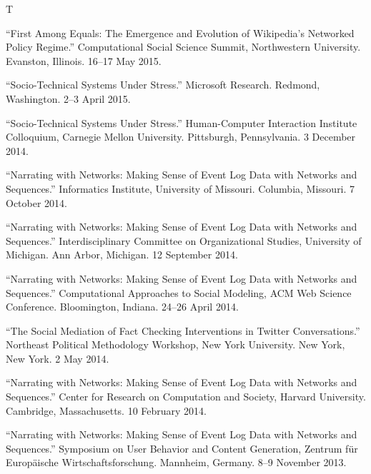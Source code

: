 \documentclass{cv}
\begin{document}
\begin{entries}{T}
		\item ``First Among Equals: The Emergence and Evolution of Wikipedia's Networked Policy Regime.'' Computational Social Science Summit, Northwestern University. Evanston, Illinois. 16--17 May 2015.
		\item ``Socio-Technical Systems Under Stress.'' Microsoft Research. Redmond, Washington. 2--3 April 2015.
		\item ``Socio-Technical Systems Under Stress.'' Human-Computer Interaction Institute Colloquium, Carnegie Mellon University. Pittsburgh, Pennsylvania. 3 December 2014.
		\item ``Narrating with Networks: Making Sense of Event Log Data with Networks and Sequences.'' Informatics Institute, University of Missouri. Columbia, Missouri. 7 October 2014.
		\item ``Narrating with Networks: Making Sense of Event Log Data with Networks and Sequences.'' Interdisciplinary Committee on Organizational Studies, University of Michigan. Ann Arbor, Michigan. 12 September 2014.
		\item ``Narrating with Networks: Making Sense of Event Log Data with Networks and Sequences.'' Computational Approaches to Social Modeling, ACM Web Science Conference. Bloomington, Indiana. 24--26 April 2014.
		\item ``The Social Mediation of Fact Checking Interventions in Twitter Conversations.'' Northeast Political Methodology Workshop, New York University. New York, New York. 2 May 2014.
		\item ``Narrating with Networks: Making Sense of Event Log Data with Networks and Sequences.'' Center for Research on Computation and Society, Harvard University. Cambridge, Massachusetts. 10 February 2014.
		\item ``Narrating with Networks: Making Sense of Event Log Data with Networks and Sequences.'' Symposium on User Behavior and Content Generation, Zentrum f\"{u}r Europ\"{a}ische Wirtschaftsforschung. Mannheim, Germany. 8--9 November 2013.
	\end{entries}
\end{document}
